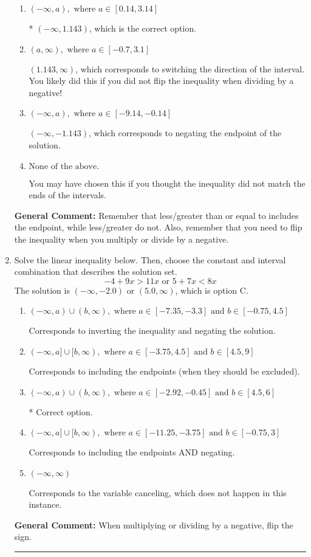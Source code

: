 \documentclass{extbook}[14pt]
\newcommand{\litem}[1]{\item #1

\rule{\textwidth}{0.4pt}}
\begin{document}
\begin{enumerate}
{\begin{enumerate}[label=\Alph*.]
 $(-1.143, \infty)$, which corresponds to switching the direction of the interval AND negating the endpoint. You likely did this if you did not flip the inequality when dividing by a negative as well as not moving values over to a side properly.
\item \( (-\infty, a), \text{ where } a \in [0.14, 3.14] \)

* $(-\infty, 1.143)$, which is the correct option.
\item \( (a, \infty), \text{ where } a \in [-0.7, 3.1] \)

 $(1.143, \infty)$, which corresponds to switching the direction of the interval. You likely did this if you did not flip the inequality when dividing by a negative!
\item \( (-\infty, a), \text{ where } a \in [-9.14, -0.14] \)

 $(-\infty, -1.143)$, which corresponds to negating the endpoint of the solution.
\item \( \text{None of the above}. \)

You may have chosen this if you thought the inequality did not match the ends of the intervals.
\end{enumerate}

\textbf{General Comment:} Remember that less/greater than or equal to includes the endpoint, while less/greater do not. Also, remember that you need to flip the inequality when you multiply or divide by a negative.
}
\litem{
Solve the linear inequality below. Then, choose the constant and interval combination that describes the solution set.
\[ -4 + 9 x > 11 x \text{ or } 5 + 7 x < 8 x \]The solution is \( (-\infty, -2.0) \text{ or } (5.0, \infty) \), which is option C.\begin{enumerate}[label=\Alph*.]
\item \( (-\infty, a) \cup (b, \infty), \text{ where } a \in [-7.35, -3.3] \text{ and } b \in [-0.75, 4.5] \)

Corresponds to inverting the inequality and negating the solution.
\item \( (-\infty, a] \cup [b, \infty), \text{ where } a \in [-3.75, 4.5] \text{ and } b \in [4.5, 9] \)

Corresponds to including the endpoints (when they should be excluded).
\item \( (-\infty, a) \cup (b, \infty), \text{ where } a \in [-2.92, -0.45] \text{ and } b \in [4.5, 6] \)

 * Correct option.
\item \( (-\infty, a] \cup [b, \infty), \text{ where } a \in [-11.25, -3.75] \text{ and } b \in [-0.75, 3] \)

Corresponds to including the endpoints AND negating.
\item \( (-\infty, \infty) \)

Corresponds to the variable canceling, which does not happen in this instance.
\end{enumerate}

\textbf{General Comment:} When multiplying or dividing by a negative, flip the sign.
}
\end{enumerate}
\end{document}

